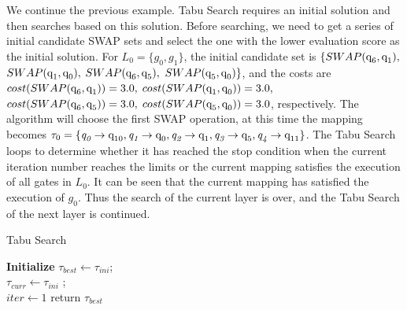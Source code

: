 \documentclass[runningheads]{llncs}
\begin{document}
\begin{example}
	We continue the previous example. Tabu Search requires an initial solution and then searches based on this solution. Before searching, we need to get a series of initial candidate SWAP sets and select the one with the lower evaluation score as the initial solution.
For $L_{0}=\{g_{0},g_{1}\}$, the initial candidate set is 
$\{SWAP(\textup{q}_\textup{6},\textup{q}_\textup{1}),$ $SWAP(\textup{q}_\textup{1},\textup{q}_\textup{0}),$ $SWAP(\textup{q}_\textup{6},\textup{q}_\textup{5}),$ $SWAP(\textup{q}_\textup{5},\textup{q}_\textup{0}) \}$, and the costs are
$cost(SWAP(\textup{q}_\textup{6},\textup{q}_\textup{1}))=3.0,$ $cost(SWAP(\textup{q}_\textup{1},\textup{q}_\textup{0}))=3.0,$\\ $cost(SWAP(\textup{q}_\textup{6},\textup{q}_\textup{5}))=3.0,$ $cost(SWAP(\textup{q}_\textup{5},\textup{q}_\textup{0}))=3.0$, respectively.
The algorithm will choose the first SWAP operation, at this time the mapping becomes $\tau_{0}=\{\textit{q}_\textit{0}\rightarrow  \textup{q}_\textup{10},\textit{q}_\textit{1}\rightarrow  \textup{q}_\textup{0},
\textit{q}_\textit{2}\rightarrow  \textup{q}_\textup{1},\textit{q}_\textit{3}\rightarrow  \textup{q}_\textup{5},\textit{q}_\textit{4}\rightarrow  \textup{q}_\textup{11}\}$. 
The Tabu Search loops to determine whether it has reached the stop condition when the current iteration number reaches the limits or the current mapping satisfies the execution of all gates in $L_{0}$. It can be seen that the current mapping has satisfied the execution of $g_{0}$. Thus the search of the current layer is over, and the Tabu Search of the next layer is continued.
\end{example}
			\begin{algorithm} 
			\label{algorithm_Tabu}
				\caption{Tabu Search }  
				\LinesNumbered  
				\textbf{Initialize}
					$\tau_{best}  \leftarrow \tau_{ini}$; \\
					$\tau_{curr} \leftarrow \tau_{ini}$ ;\\
					$iter \leftarrow 1$  
				return $\tau_{best}$
				\end{algorithm}
\end{document}
